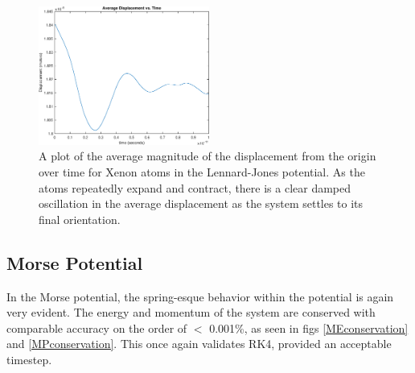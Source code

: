 \documentclass[12pt]{article}
\begin{document}
\begin{figure}
\begin{center}
\includegraphics[width=0.5\textwidth]{./finalpics/LJaverager.eps}
\caption{\label{LJaverager} A plot of the average magnitude of the displacement from the origin over time for Xenon atoms in the Lennard-Jones potential.  As the atoms repeatedly expand and contract, there is a clear damped oscillation in the average displacement as the system settles to its final orientation.}
\end{center}
\end{figure}

\subsection*{Morse Potential}
In the Morse potential, the spring-esque behavior within the potential is again very evident.  The energy and momentum of the system are conserved with comparable accuracy on the order of $<$ 0.001\%, as seen in figs \ref{MEconservation} and \ref{MPconservation}.  This once again validates RK4, provided an acceptable timestep.
\end{document}

